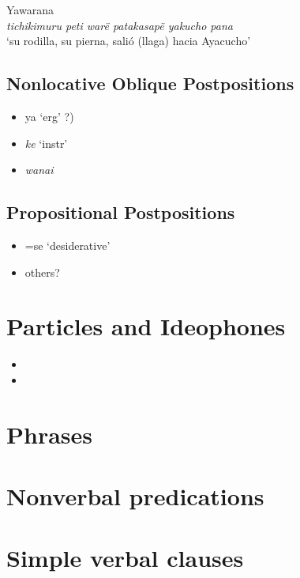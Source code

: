 \documentclass{memoir}
\begin{document}
\ex Yawarana \\
\label{histpajirdi-186}    \textit{tichikimuru peti warë patakasapë yakucho pana }\\
        ‘su rodilla, su pierna, salió (llaga) hacia Ayacucho’ \xe

\section{Nonlocative Oblique Postpositions}

\begin{itemize}
\tightlist
\item
   ya `erg' ?)
\item
  \emph{ke} `instr'
\item
  \emph{wanai}
\end{itemize}

\section{Propositional Postpositions}

\begin{itemize}
\tightlist
\item
  =se `desiderative'
\item
  others?
\end{itemize}

\chapter{\texorpdfstring{Particles and Ideophones
\label{partideo}}{Particles and Ideophones }}

\begin{itemize}
\tightlist
\item
\item
\end{itemize}

\chapter{\texorpdfstring{Phrases \label{phrases}}{Phrases }}

\chapter{\texorpdfstring{Nonverbal predications
\label{nonverbal}}{Nonverbal predications }}

\chapter{\texorpdfstring{Simple verbal clauses
\label{simpleverb}}{Simple verbal clauses }}
\end{document}
